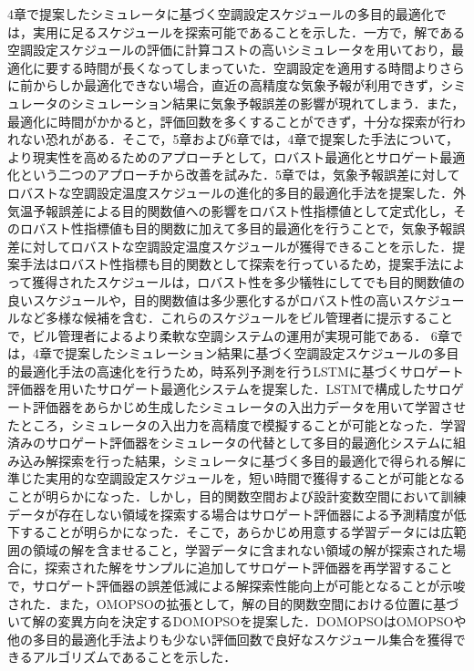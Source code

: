 4章で提案したシミュレータに基づく空調設定スケジュールの多目的最適化では，実用に足るスケジュールを探索可能であることを示した．一方で，解である空調設定スケジュールの評価に計算コストの高いシミュレータを用いており，最適化に要する時間が長くなってしまっていた．空調設定を適用する時間よりさらに前からしか最適化できない場合，直近の高精度な気象予報が利用できず，シミュレータのシミュレーション結果に気象予報誤差の影響が現れてしまう．また，最適化に時間がかかると，評価回数を多くすることができず，十分な探索が行われない恐れがある．そこで，5章および6章では，4章で提案した手法について，より現実性を高めるためのアプローチとして，ロバスト最適化とサロゲート最適化という二つのアプローチから改善を試みた．5章では，気象予報誤差に対してロバストな空調設定温度スケジュールの進化的多目的最適化手法を提案した．外気温予報誤差による目的関数値への影響をロバスト性指標値として定式化し，そのロバスト性指標値も目的関数に加えて多目的最適化を行うことで，気象予報誤差に対してロバストな空調設定温度スケジュールが獲得できることを示した．提案手法はロバスト性指標も目的関数として探索を行っているため，提案手法によって獲得されたスケジュールは，ロバスト性を多少犠牲にしてでも目的関数値の良いスケジュールや，目的関数値は多少悪化するがロバスト性の高いスケジュールなど多様な候補を含む．これらのスケジュールをビル管理者に提示することで，ビル管理者によるより柔軟な空調システムの運用が実現可能である．
6章では，4章で提案したシミュレーション結果に基づく空調設定スケジュールの多目的最適化手法の高速化を行うため，時系列予測を行うLSTMに基づくサロゲート評価器を用いたサロゲート最適化システムを提案した．LSTMで構成したサロゲート評価器をあらかじめ生成したシミュレータの入出力データを用いて学習させたところ，シミュレータの入出力を高精度で模擬することが可能となった．学習済みのサロゲート評価器をシミュレータの代替として多目的最適化システムに組み込み解探索を行った結果，シミュレータに基づく多目的最適化で得られる解に準じた実用的な空調設定スケジュールを，短い時間で獲得することが可能となることが明らかになった．しかし，目的関数空間および設計変数空間において訓練データが存在しない領域を探索する場合はサロゲート評価器による予測精度が低下することが明らかになった．そこで，あらかじめ用意する学習データには広範囲の領域の解を含ませること，学習データに含まれない領域の解が探索された場合に，探索された解をサンプルに追加してサロゲート評価器を再学習することで，サロゲート評価器の誤差低減による解探索性能向上が可能となることが示唆された．また，OMOPSOの拡張として，解の目的関数空間における位置に基づいて解の変異方向を決定するDOMOPSOを提案した．DOMOPSOはOMOPSOや他の多目的最適化手法よりも少ない評価回数で良好なスケジュール集合を獲得できるアルゴリズムであることを示した．

